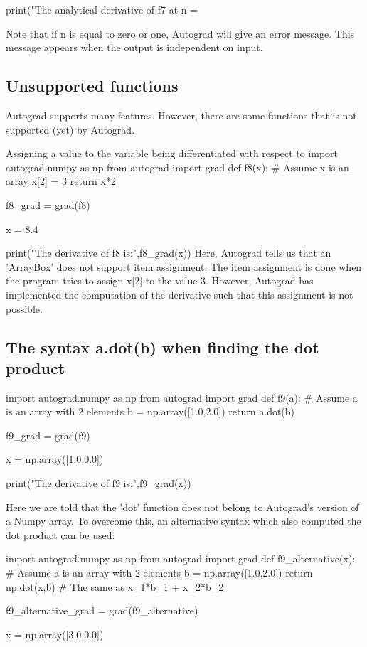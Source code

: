 \documentclass[%
oneside,                 %
final,                   %
10pt]{article}
\begin{document}
print("The analytical derivative of f7 at n = %

\epycod
Note that if n is equal to zero or one, Autograd will give an error message. This message appears when the output is independent on input.

\subsection{Unsupported functions}
Autograd supports many features. However, there are some functions that is not supported (yet) by Autograd.

Assigning a value to the variable being differentiated with respect to
\bpycod
import autograd.numpy as np
from autograd import grad
def f8(x): # Assume x is an array
    x[2] = 3
    return x*2

f8_grad = grad(f8)

x = 8.4

print("The derivative of f8 is:",f8_grad(x))
\epycod
Here, Autograd tells us that an 'ArrayBox' does not support item assignment. The item assignment is done when the program tries to assign x[2] to the value 3. However, Autograd has implemented the computation of the derivative such that this assignment is not possible.

\subsection{The syntax a.dot(b) when finding the dot product}
\bpycod
import autograd.numpy as np
from autograd import grad
def f9(a): # Assume a is an array with 2 elements
    b = np.array([1.0,2.0])
    return a.dot(b)

f9_grad = grad(f9)

x = np.array([1.0,0.0])

print("The derivative of f9 is:",f9_grad(x))
\epycod

Here we are told that the 'dot' function does not belong to Autograd's
version of a Numpy array.  To overcome this, an alternative syntax
which also computed the dot product can be used:

\bpycod
import autograd.numpy as np
from autograd import grad
def f9_alternative(x): # Assume a is an array with 2 elements
    b = np.array([1.0,2.0])
    return np.dot(x,b) # The same as x_1*b_1 + x_2*b_2

f9_alternative_grad = grad(f9_alternative)

x = np.array([3.0,0.0])
\end{document}
